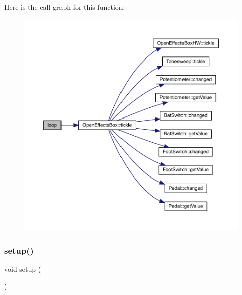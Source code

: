 Here is the call graph for this function\+:\nopagebreak
\begin{figure}[H]
\begin{center}
\leavevmode
\includegraphics[width=350pt]{general_open_effects_box__v4_8ino_afe461d27b9c48d5921c00d521181f12f_cgraph}
\end{center}
\end{figure}
\mbox{\label{general_open_effects_box__v4_8ino_a4fc01d736fe50cf5b977f755b675f11d}} 
\subsubsection{\texorpdfstring{setup()}{setup()}}
{\footnotesize\ttfamily void setup (\begin{DoxyParamCaption}{ }\end{DoxyParamCaption})}


